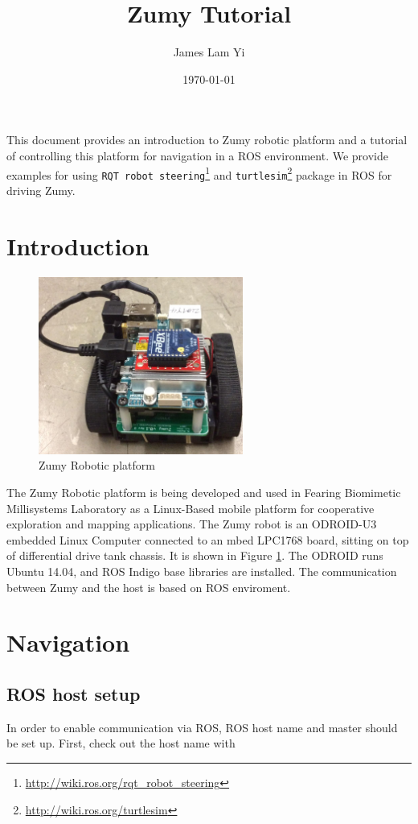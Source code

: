 \documentclass{article}
\begin{document}
\title{Zumy Tutorial}
\author{James Lam Yi}
\date{\today}
\maketitle
This document provides an introduction to Zumy robotic platform and a tutorial of controlling this platform for navigation in a ROS environment. We provide examples for using \verb=RQT robot steering=\footnote{\url{http://wiki.ros.org/rqt_robot_steering}} and \verb=turtlesim=\footnote{\url{http://wiki.ros.org/turtlesim}} package in ROS for driving Zumy. 

\section{Introduction}
\begin{figure}[h]
\centering
\includegraphics[width=0.6\textwidth]{img/zumy.jpg}
\caption{Zumy Robotic platform}
\label{fig:zumy}
\end{figure}
The Zumy Robotic platform is being developed and used in Fearing Biomimetic Millisystems Laboratory as a Linux-Based mobile platform for cooperative exploration and mapping applications. The Zumy robot is an ODROID-U3 embedded Linux Computer connected to an mbed LPC1768 board, sitting on top of differential drive tank chassis. It is shown in Figure \ref{fig:zumy}. The ODROID runs Ubuntu 14.04, and ROS Indigo base libraries are installed. The communication between Zumy and the host is based on ROS enviroment.

\section{Navigation}
\subsection{ROS host setup}
In order to enable communication via ROS, ROS host name and master should be set up. First, check out the host name with
\end{document}

